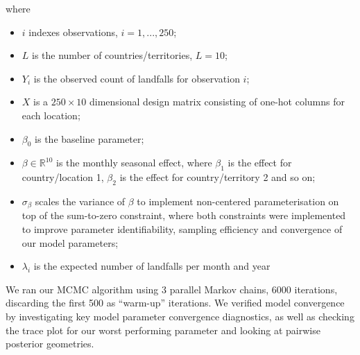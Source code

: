 \documentclass[
]{article}
\providecommand{\tightlist}{%
  \setlength{\itemsep}{0pt}\setlength{\parskip}{0pt}}
\begin{document}
where

\begin{itemize}
\tightlist
\item
  \(i\) indexes observations, \(i=1,...,250\);
\item
  \(L\) is the number of countries/territories, \(L=10\);
\item
  \(Y_{i}\) is the observed count of landfalls for observation \(i\);
\item
  \(X\) is a \(250 \times 10\) dimensional design matrix consisting of one-hot columns for each location;
\item
  \(\beta_0\) is the baseline parameter;
\item
  \(\beta \in \mathbb{R}^{10}\) is the monthly seasonal effect, where \(\beta_1\) is the effect for country/location 1, \(\beta_2\) is the effect for country/territory 2 and so on;
\item
  \(\sigma_{\beta}\) scales the variance of \(\beta\) to implement non-centered parameterisation on top of the sum-to-zero constraint, where both constraints were implemented to improve parameter identifiability, sampling efficiency and convergence of our model parameters;
\item
  \(\lambda_{i}\) is the expected number of landfalls per month and year
\end{itemize}

We ran our MCMC algorithm using 3 parallel Markov chains, 6000 iterations, discarding the first 500 as ``warm-up'' iterations. We verified model convergence by investigating key model parameter convergence diagnostics, as well as checking the trace plot for our worst performing parameter and looking at pairwise posterior geometries.
\end{document}
